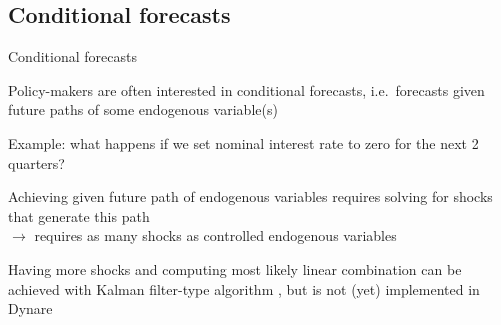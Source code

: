 \documentclass[handout,usepdftitle=false,xcolor=dvipsnames,aspectratio=169]{beamer}
\begin{document}
\subsection{Conditional forecasts}


\begin{frame}{Conditional forecasts}
  \begin{witemize}
    \item Policy-makers are often interested in conditional forecasts, i.e.\ forecasts given future paths of some endogenous variable(s)
    \item Example: what happens if we set nominal interest rate to zero for the next 2 quarters?
    \item Achieving given future path of endogenous variables requires solving for shocks that generate this path\\
    $\rightarrow$ requires as many shocks as controlled endogenous variables
    \item Having more shocks and computing most likely linear combination can be achieved with Kalman filter-type algorithm \parencite[e.g.][]{BanburaEtAl2015}, but is not (yet) implemented in Dynare
  \end{witemize}
\end{frame}
\end{document}
